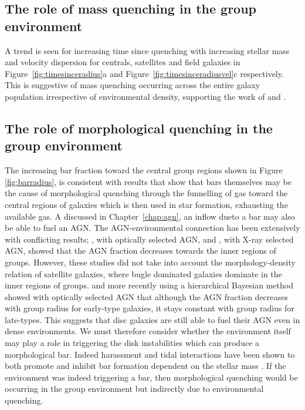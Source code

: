 \subsection{The role of mass quenching in the group environment}\label{sec:rolemassenv}

A trend is seen for increasing time since quenching with increasing stellar mass and velocity dispersion for centrals, satellites and field galaxies in Figure~\ref{fig:timesinceradius}a and Figure~\ref{fig:timesinceradiusvel}c respectively. This is suggestive of mass quenching occurring across the entire galaxy population irrespective of environmental density, supporting the work of \citet{peng10, peng12, Gabor10} and \citet{darvish16}.

\subsection{The role of morphological quenching in the group environment}\label{sec:rolemorphenv}

The increasing bar fraction toward the central group regions  shown in Figure \ref{fig:barradius}, is consistent with results that show that bars themselves may be the cause of morphological quenching through the funnelling of gas toward the central regions of galaxies \citep{athanassoula92b, sheth05,masters10c} which is then used in star formation, exhausting the available gas. A discussed in Chapter~\ref{chap:agn}, an inflow dueto a bar may also be able to fuel an AGN. The AGN-environmental connection has been extensively with conflicting results; \cite{pimbblet13}, with optically selected AGN, and \cite{elhert14}, with X-ray selected AGN, showed that the AGN fraction decreases towards the inner regions of groups. However, these studies did not take into account the morphology-density relation of satellite galaxies, where bugle dominated galaxies dominate in the inner regions of groups. \cite{miller03} and more recently \cite{desouza16} using a hierarchical Bayesian method showed with optically selected AGN that although the AGN fraction decreases with group radius for early-type galaxies, it stays constant with group radius for late-types. This suggests that disc galaxies are still able to fuel their AGN even in dense environments. We must therefore consider whether the environment itself may play a role in triggering the disk instabilities which can produce a morphological bar. Indeed harassment and tidal interactions have been shown to both promote and inhibit bar formation dependent on the stellar mass \citep{noguchi88, moore96, skibba12}.  If the environment was indeed triggering a bar, then morphological quenching would be occurring in the group environment but indirectly due to environmental quenching. 

